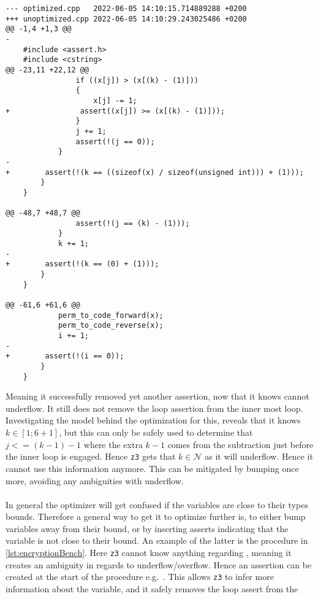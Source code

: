 \begin{lstlisting}[label={lst:permmoddiff}, caption={Output from \lsin{diff -u} after modifying
    the loop variable \lsin{k}.}]
--- optimized.cpp	2022-06-05 14:10:15.714889288 +0200
+++ unoptimized.cpp	2022-06-05 14:10:29.243025486 +0200
@@ -1,4 +1,3 @@
-
    #include <assert.h>
    #include <cstring>
@@ -23,11 +22,12 @@
                if ((x[j]) > (x[(k) - (1)]))
                {
                    x[j] -= 1;
+                assert((x[j]) >= (x[(k) - (1)]));
                }
                j += 1;
                assert(!(j == 0));
            }
-        
+        assert(!(k == ((sizeof(x) / sizeof(unsigned int))) + (1)));
        }
    }
    
@@ -48,7 +48,7 @@
                assert(!(j == (k) - (1)));
            }
            k += 1;
-        
+        assert(!(k == (0) + (1)));
        }
    }
    
@@ -61,6 +61,6 @@
            perm_to_code_forward(x);
            perm_to_code_reverse(x);
            i += 1;
-        
+        assert(!(i == 0));
        }
    }
\end{lstlisting}
\noindent
Meaning it successfully removed yet another assertion, now that it knows  cannot underflow.
It still does not remove the loop assertion from the inner most loop. Investigating the model
behind the optimization for this, reveals that it knows $k \in [1;6+1]$, but this can only be
safely used to determine that $j <= (k-1)-1$ where the extra $k-1$ comes from the subtraction
just before the inner loop is engaged. Hence \texttt{z3} gets that $k\in \mathcal{N}$ as it will
underflow. Hence it cannot use this information anymore. This can be mitigated by bumping 
once more, avoiding any ambiguities with underflow.
\\
\\
In general the \lan optimizer will get confused if the variables are close to their types bounds.
Therefore a general way to get it to optimize further is, to either bump variables away from their
bound, or by inserting asserts indicating that the variable is not close to their bound. An
example of the latter is the  procedure in \autoref{lst:encryptionBench}.
Here \texttt{z3} cannot know anything regarding , meaning it creates an
ambiguity in regards to underflow/overflow. Hence an assertion can be created at the start
of the procedure e.g.\ . This allows \texttt{z3}
to infer more information about the variable, and it safely removes the loop assert from the
